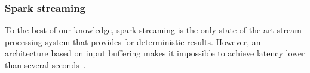 \subsubsection{Spark streaming}

To the best of our knowledge, spark streaming is the only state-of-the-art stream processing system that provides for deterministic results. However, an architecture based on input buffering makes it impossible to achieve latency lower than several seconds~\cite{7530084, 7474816}. 










